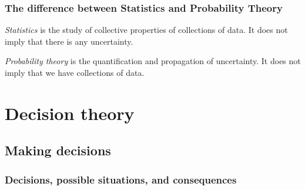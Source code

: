\documentclass[
  a4paper,
  DIV=11,
  numbers=noendperiod,
  oneside]{scrreprt}
\begin{document}
\providecommand{\ul}{\uline}
\renewcommand*{\|}[1][]{\nonscript\:#1\vert\nonscript\:\mathopen{}}
\providecommand*{\pr}[1]{\textsf{\small`#1'}}
\renewcommand*{\pr}[1]{\textsf{\small`#1'}}
\providecommand*{\prq}[1]{\textsf{\small #1}}

\providecommand{\se}[1]{\mathsfit{#1}}
\renewcommand{\se}[1]{\mathsfit{#1}}
\providecommand{\p}{\mathrm{p}}
\renewcommand{\p}{\mathrm{p}}
\renewcommand{\P}{\mathrm{P}}

\providecommand*{\mo}[1][=]{\mathord{\,#1\,}}
\providecommand*{\yX}{\se{X}}
\providecommand*{\yY}{\se{Y}}
\providecommand*{\yI}{\se{I}}
\providecommand*{\yi}[1][]{\se{I}_{\text{#1}}}
\providecommand{\di}{\mathrm{d}}

\hypertarget{the-difference-between-statistics-and-probability-theory}{%
\section{The difference between Statistics and Probability
Theory}\label{the-difference-between-statistics-and-probability-theory}}

\emph{Statistics} is the study of collective properties of collections
of data. It does not imply that there is any uncertainty.

\emph{Probability theory} is the quantification and propagation of
uncertainty. It does not imply that we have collections of data.

\part{Decision theory}

\hypertarget{making-decisions}{%
\chapter{Making decisions}\label{making-decisions}}

\hypertarget{decisions-possible-situations-and-consequences}{%
\section{Decisions, possible situations, and
consequences}\label{decisions-possible-situations-and-consequences}}
\end{document}
